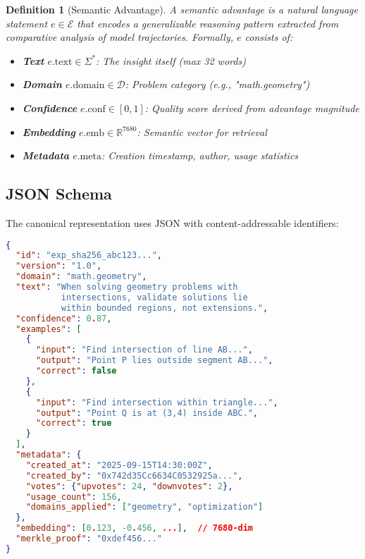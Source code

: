 \documentclass[11pt,letterpaper]{article}
\newtheorem{definition}{Definition}[section]
\begin{document}
\begin{definition}[Semantic Advantage]
A semantic advantage is a natural language statement $e \in \mathcal{E}$ that encodes a generalizable reasoning pattern extracted from comparative analysis of model trajectories. Formally, $e$ consists of:

\begin{itemize}
    \item \textbf{Text} $e.\text{text} \in \Sigma^*$: The insight itself (max 32 words)
    \item \textbf{Domain} $e.\text{domain} \in \mathcal{D}$: Problem category (e.g., "math.geometry")
    \item \textbf{Confidence} $e.\text{conf} \in [0,1]$: Quality score derived from advantage magnitude
    \item \textbf{Embedding} $e.\text{emb} \in \mathbb{R}^{7680}$: Semantic vector for retrieval
    \item \textbf{Metadata} $e.\text{meta}$: Creation timestamp, author, usage statistics
\end{itemize}
\end{definition}

\subsection{JSON Schema}

The canonical representation uses JSON with content-addressable identifiers:

\begin{lstlisting}[language=json,caption=Experience JSON Schema,label=lst:schema]
{
  "id": "exp_sha256_abc123...",
  "version": "1.0",
  "domain": "math.geometry",
  "text": "When solving geometry problems with 
           intersections, validate solutions lie 
           within bounded regions, not extensions.",
  "confidence": 0.87,
  "examples": [
    {
      "input": "Find intersection of line AB...",
      "output": "Point P lies outside segment AB...",
      "correct": false
    },
    {
      "input": "Find intersection within triangle...",
      "output": "Point Q is at (3,4) inside ABC.",
      "correct": true
    }
  ],
  "metadata": {
    "created_at": "2025-09-15T14:30:00Z",
    "created_by": "0x742d35Cc6634C0532925a...",
    "votes": {"upvotes": 24, "downvotes": 2},
    "usage_count": 156,
    "domains_applied": ["geometry", "optimization"]
  },
  "embedding": [0.123, -0.456, ...],  // 7680-dim
  "merkle_proof": "0xdef456..."
}
\end{lstlisting}
\end{document}
